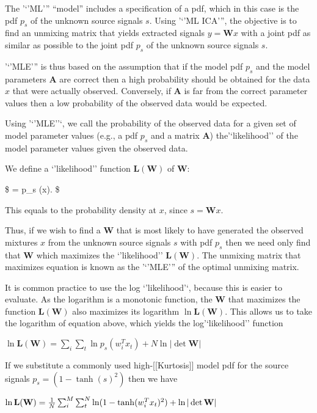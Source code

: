 \documentclass[11pt]{article}
\begin{document}
The '`'ML''' ``model'' includes a specification of a pdf, which in this
case is the pdf \(p_s\) of the unknown source signals \(s\). Using '`'ML
ICA''', the objective is to find an unmixing matrix that yields
extracted signals \(y = \mathbf{W}x\) with a joint pdf as similar as
possible to the joint pdf \(p_s\) of the unknown source signals \(s\).

'`'MLE''' is thus based on the assumption that if the model pdf \(p_s\)
and the model parameters \(\mathbf{A}\) are correct then a high
probability should be obtained for the data \(x\) that were actually
observed. Conversely, if \(\mathbf{A}\) is far from the correct
parameter values then a low probability of the observed data would be
expected.

Using '`'MLE''`, we call the probability of the observed data for a
given set of model parameter values (e.g., a pdf \(p_s\) and a matrix
\(\mathbf{A}\)) the'`likelihood'' of the model parameter values given
the observed data.

We define a `'likelihood'' function \(\mathbf{L(W)}\) of \(\mathbf{W}\):

\$ = p\_s
(x)\textbar{}\det {}\textbar{}. \$

This equals to the probability density at \(x\), since
\(s = \mathbf{W}x\).

Thus, if we wish to find a \(\mathbf{W}\) that is most likely to have
generated the observed mixtures \(x\) from the unknown source signals
\(s\) with pdf \(p_s\) then we need only find that \(\mathbf{W}\) which
maximizes the `'likelihood'' \(\mathbf{L(W)}\). The unmixing matrix that
maximizes equation is known as the '`'MLE''' of the optimal unmixing
matrix.

It is common practice to use the log `'likelihood'`, because this is
easier to evaluate. As the logarithm is a monotonic function, the
\(\mathbf{W}\) that maximizes the function \(\mathbf{L(W)}\) also
maximizes its logarithm \(\ln \mathbf{L(W)}\). This allows us to take
the logarithm of equation above, which yields the log'`likelihood''
function

\(\ln \mathbf{L(W)} =\sum_{i}\sum_{t} \ln p_s(w^T_ix_t) + N\ln|\det \mathbf{W}|\)

If we substitute a commonly used high-{[}{[}Kurtosis{]}{]} model pdf for
the source signals \(p_s = (1-\tanh(s)^2)\) then we have

\(\ln \mathbf{L(W)} ={1 \over N}\sum_{i}^{M} \sum_{t}^{N}\ln(1-\tanh(w^T_i x_t )^2) + \ln |\det \mathbf{W}|\)
\end{document}
